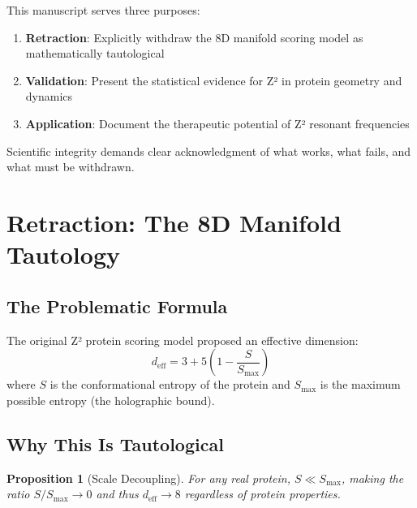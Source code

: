 \documentclass[11pt,a4paper]{article}
\theoremstyle{plain}
\newtheorem{proposition}[theorem]{Proposition}
\theoremstyle{definition}
\theoremstyle{remark}
\newcommand{\deff}{d_{\text{eff}}}
\newcommand{\Smax}{S_{\text{max}}}
\begin{document}
This manuscript serves three purposes:
\begin{enumerate}[label=(\arabic*)]
    \item \textbf{Retraction}: Explicitly withdraw the 8D manifold scoring model as mathematically tautological
    \item \textbf{Validation}: Present the statistical evidence for Z² in protein geometry and dynamics
    \item \textbf{Application}: Document the therapeutic potential of Z² resonant frequencies
\end{enumerate}

Scientific integrity demands clear acknowledgment of what works, what fails, and what must be withdrawn.

\section{Retraction: The 8D Manifold Tautology}

\subsection{The Problematic Formula}

The original Z² protein scoring model proposed an effective dimension:
\begin{equation}
    \deff = 3 + 5\left(1 - \frac{S}{\Smax}\right)
    \label{eq:deff}
\end{equation}
where $S$ is the conformational entropy of the protein and $\Smax$ is the maximum possible entropy (the holographic bound).

\subsection{Why This Is Tautological}

\begin{proposition}[Scale Decoupling]
For any real protein, $S \ll \Smax$, making the ratio $S/\Smax \to 0$ and thus $\deff \to 8$ regardless of protein properties.
\end{proposition}
\end{document}
